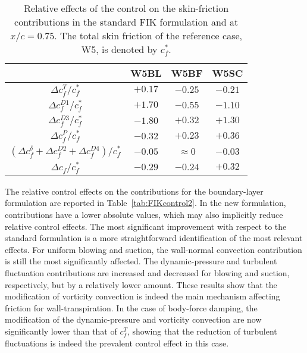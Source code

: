 \begin{table}
\caption{\label{tab:FIKcontrol}Relative effects of the control on the skin-friction contributions in the standard FIK formulation and at $x/c=0.75$. The total skin friction of the reference case, W5, is denoted by $c_f^*$.}
\centering
\begin{tabular}{cccc}
\hline \hline
 &W5BL& W5BF & W5SC\\  \hline
$\Delta c^T_f/c_f^*$ & $+0.17$ & $-0.25$ & $-0.21$ \\   \hline
$\Delta c^{D1}_f/c_f^{*}$ & $+1.70$ & $\bm{-0.55}$ & $-1.10$ \\
$\Delta c^{D3}_f/c_f^{*}$ & $\bm{-1.80}$ & $+0.32$ & $\bm{+1.30}$ \\
$\Delta c^{P}_f/c_f^{*}$ & $-0.32$ & $+0.23$ & $+0.36$ \\   \hline
$(\Delta c^{\delta}_f+\Delta c^{D2}_f+\Delta c^{D4}_f)/c_f^{*}$ & $-0.05$ & $\approx 0$ & $-0.03$ \\   \hline
$\Delta c_f/c_f^{*}$ & $-0.29$ & $-0.24$ & $+0.32$  \\
\hline \hline
\end{tabular}
 
\end{table}

The relative control effects on the contributions for the boundary-layer formulation are reported in Table~\ref{tab:FIKcontrol2}. In the new formulation, contributions have a lower absolute values, which may also implicitly reduce relative control effects. The most significant improvement with respect to the standard formulation is a more straightforward identification of the most relevant effects. For uniform blowing and suction, the wall-normal convection contribution is still the most significantly affected. The dynamic-pressure and turbulent fluctuation contributions are increased and decreased for blowing and suction, respectively, but by a relatively lower amount. These results show that the modification of vorticity convection is indeed the main mechanism affecting friction for wall-transpiration. In the case of body-force damping, the modification of the dynamic-pressure and vorticity convection are now significantly lower than that of $c^T_f$, showing that the reduction of turbulent fluctuations is indeed the prevalent control effect in this case. 


